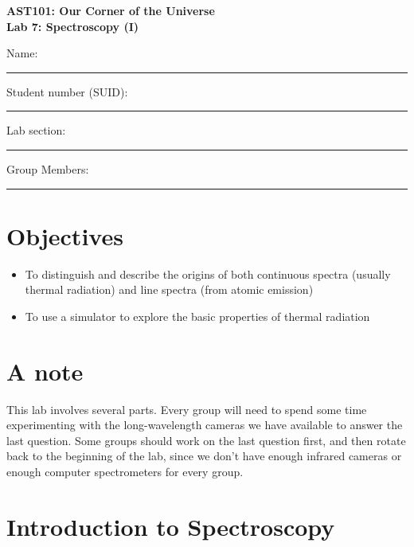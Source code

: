 \documentclass[11pt]{article}
\begin{document}
\begin{center}
\textbf{\Large
AST101: Our Corner of the Universe \\
\vspace*{0.1cm}
Lab 7: Spectroscopy (I)
}
\end{center}

\vspace*{0.5cm}

{\Large Name:}\vspace*{0.5cm}\\\hrule
{\Large Student number (SUID):}\vspace*{0.5cm}\\\hrule
{\Large Lab section:}\vspace*{0.5cm}\\\hrule
{\Large Group Members:}\vspace*{0.5cm}\\\hrule
\vspace*{0.5cm}


\section{Objectives}
\begin{itemize}
	\item To distinguish and describe the origins of both continuous spectra (usually thermal radiation) and line spectra (from atomic emission)
	\item To use a simulator to explore the basic properties of thermal radiation
\end{itemize}

\section{A note}
This lab involves several parts. Every group will need to spend some time experimenting with the long-wavelength cameras we have available to answer the last question. Some groups should work on the last question first, and then rotate back to the beginning of the lab, since we don't have enough infrared cameras or enough computer spectrometers for every group.

\section{Introduction to Spectroscopy}
\end{document}
